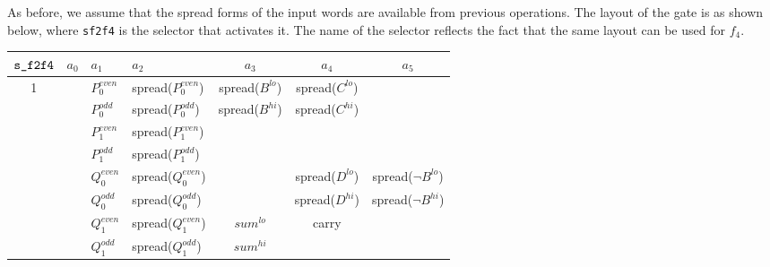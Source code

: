\documentclass[10pt]{article}
\begin{document}
 As before, we assume that the spread forms of the input words are available from previous operations. The layout of the gate is as shown below, where \texttt{s\textunderscore f2f4} is the selector that activates it. The name of the selector reflects the fact that the same layout can be used for $f_4$.
\begin{center}
  \begin{tabular}{c|c|l|l|c|c|c}
    $\texttt{s\textunderscore f2f4}$ & $a_0$ & $a_1$ & $a_2$ & $a_3$ & $a_4$ & $a_5$ \\ \hline
    1  &     & $P_0^{even}$ & spread($P_0^{even}$) & spread($B^{lo}$) & spread($C^{lo}$)  &                         \\ 
       &     & $P_0^{odd}$  & spread($P_0^{odd}$)  & spread($B^{hi}$) & spread($C^{hi}$)  &                         \\ 
       &     & $P_1^{even}$ & spread($P_1^{even}$) &                  &                   &                         \\ 
       &     & $P_1^{odd}$  & spread($P_1^{odd}$)  &                  &                   &                         \\
       &     & $Q_0^{even}$ & spread($Q_0^{even}$) &                  & spread($D^{lo}$)  & spread($\lnot B^{lo}$)  \\ 
       &     & $Q_0^{odd}$  & spread($Q_0^{odd}$)  &                  & spread($D^{hi}$)  & spread($\lnot B^{hi}$)  \\ 
       &     & $Q_1^{even}$ & spread($Q_1^{even}$) & $sum^{lo}$       & carry             &                         \\ 
       &     & $Q_1^{odd}$  & spread($Q_1^{odd}$)  & $sum^{hi}$       &                   &                         \\ \hline
  \end{tabular}
\end{center}
\end{document}
